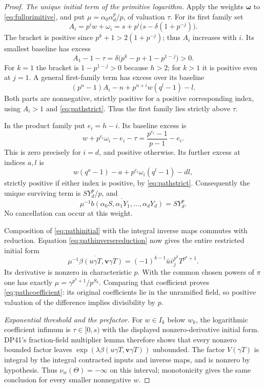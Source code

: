 \begin{proof}
\emph{The unique initial term of the primitive logarithm.}
Apply the weights $\boldsymbol\omega$ to \eqref{eq:fullprimitive}, and put
$\mu=\alpha_0\alpha_d^p/p$, of valuation $\tau$.
For its first family set
\[
 A_i=p^iw+\omega_i=s+p^i\bigl(s-\delta(1+p^{-j})\bigr).
\]
The bracket is positive since $p^k+1>2(1+p^{-j})$; thus $A_i$ increases with $i$. Its smallest baseline has excess
\[
 A_1-1-\tau
       =\delta\bigl(p^k-p+1-p^{1-j}\bigr)>0.
\]
For $k=1$ the bracket is $1-p^{1-j}>0$ because $h>2$; for $k>1$ it is positive even at $j=1$. A general first-family term has excess over its baseline
\[
 (p^n-1)A_i-n+p^{n+i}w(q^l-1)-l.
\]
Both parts are nonnegative, strictly positive for a positive corresponding index, using $A_i>1$ and \eqref{eq:pathstrict}. Thus the first family lies strictly above $\tau$.

In the product family put $e_i=h-i$. Its baseline excess is
\[
 w+p^{e_i}\omega_i-e_i-\tau
       =\frac{p^{e_i}-1}{p-1}-e_i.
\]
This is zero precisely for $i=d$, and positive otherwise. Its further excess at indices $a,l$ is
\[
 w(q^a-1)-a+p^{e_i}\omega_i(q^l-1)-dl,
\]
strictly positive if either index is positive, by \eqref{eq:pathstrict}. Consequently the unique surviving term is $SY_d^p/p$, and
\begin{equation}\label{eq:pathinitial}
 \overline{\mu^{-1}b(\alpha_0S,\alpha_1Y_1,\ldots,\alpha_dY_d)}
       =SY_d^p.
\end{equation}
No cancellation can occur at this weight.

Composition of \eqref{eq:pathinitial} with the integral inverse maps commutes with reduction. Equation \eqref{eq:pathinversereduction} now gives the entire restricted initial form
\[
 \overline{\mu^{-1}\beta(u\gamma T,\mathbf v\gamma T)}
       =(-1)^{k-1}\bar u\bar v_j^{p^k}T^{p^k+1}.
\]
Its derivative is nonzero in characteristic $p$. With the common chosen powers of $\pi$ one has exactly
$\mu=\gamma^{p^k+1}/p^{S_k}$.
Comparing that coefficient proves \eqref{eq:pathcoefficient}: its original coefficients lie in the unramified field, so positive valuation of the difference implies divisibility by $p$.

\emph{Exponential threshold and the prefactor.}
For $w\in I_k$ below $w_k$, the logarithmic coefficient infimum is
$\tau\in[0,s)$ with the displayed nonzero-derivative initial form.
DP41's fraction-field multiplier lemma therefore shows that every nonzero bounded factor leaves $\exp(\lambda\beta(u\gamma T,\mathbf v\gamma T))$ unbounded.
The factor $V(\gamma T)$ is integral by the integral contracted inputs and inverse maps, and is nonzero by hypothesis. Thus $\nu_w(\Theta)=-\infty$ on this interval; monotonicity gives the same conclusion for every smaller nonnegative $w$.


\end{proof}
